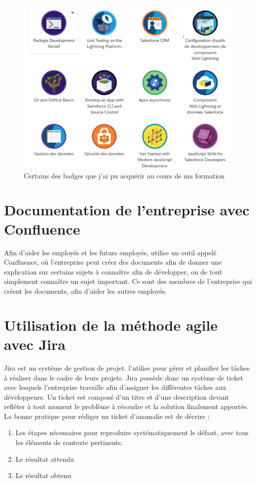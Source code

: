 \documentclass[12pt,oneside,noprintercorrection]{iut}
\begin{document}
\begin{figure}[!ht]
  \centering
  \includegraphics[width=12cm]{img/badgeSlf.png}
  \caption{Certains des badges que j'ai pu acquérir au cours de ma formation}
\end{figure}

\section{Documentation de l'entreprise avec Confluence}
Afin d'aider les employés et les futurs employés, \gz{} utilise un outil appelé Confluence, où l'entreprise peut créer des documents afin de donner une explication sur certains sujets à connaître afin de développer, ou de tout simplement connaître un sujet important. Ce sont des membres de l'entreprise qui créent les documents, afin d'aider les autres employés.

\section{Utilisation de la méthode agile avec Jira}
Jira est un système de gestion de projet. \gz{} l'utilise pour gérer et planifier les tâches à réaliser dans le cadre de leurs projets. Jira possède donc un système de ticket avec lesquels l'entreprise travaille afin d'assigner les différentes tâches aux développeurs. Un ticket est composé d'un titre et d'une description devant refléter à tout moment le problème à résoudre et la solution finalement apportée. La bonne pratique pour rédiger un ticket d'anomalie est de décrire : 
\begin{enumerate}
    \item Les étapes nécessaires pour reproduire systématiquement le défaut, avec tous les éléments de contexte pertinents.
    \item Le résultat attendu
    \item Le résultat obtenu
\end{enumerate}
\end{document}

